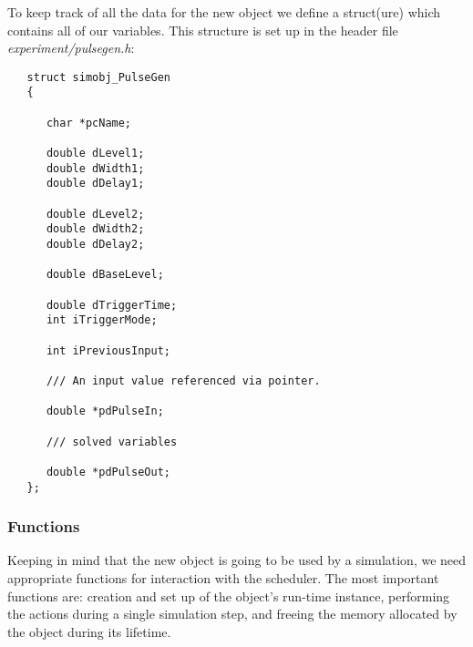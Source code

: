 \documentclass[12pt]{article}
\begin{document}
To keep track of all the data for the new object we define a struct(ure) which contains all of our variables. This structure is set up in the header file {\it experiment/pulsegen.h}:
\begin{verbatim}
   struct simobj_PulseGen
   {
   
      char *pcName;

      double dLevel1;
      double dWidth1;
      double dDelay1;

      double dLevel2;
      double dWidth2;
      double dDelay2;

      double dBaseLevel;

      double dTriggerTime;
      int iTriggerMode;
  
      int iPreviousInput;

      /// An input value referenced via pointer. 
  
      double *pdPulseIn;

      /// solved variables

      double *pdPulseOut;
   };
\end{verbatim}

\subsubsection*{Functions}

Keeping in mind that the new object is going to be used by a
simulation, we need appropriate functions for interaction with the
scheduler.  The most important functions are: creation and set up of
the object's run-time instance, performing the actions during a single
simulation step, and freeing the memory allocated by the object during
its lifetime.
\end{document}
